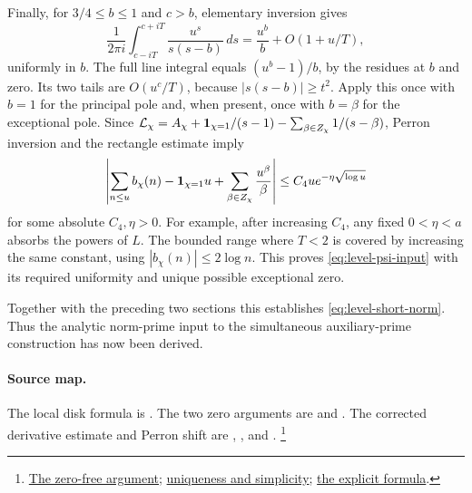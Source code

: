 Finally, for \(3/4\leq b\leq1\) and \(c>b\), elementary inversion
gives
\[
 \frac1{2\pi i}\int_{c-iT}^{c+iT}
                         \frac{u^s}{s(s-b)}\,ds
               =\frac{u^b}{b}+O(1+u/T),
\]
uniformly in \(b\).
The full line integral equals \((u^b-1)/b\), by the residues at
\(b\) and zero. Its two tails are \(O(u^c/T)\), because
\(|s(s-b)|\geq t^2\).
Apply this once with \(b=1\) for the principal pole and, when
present, once with \(b=\beta\) for the exceptional pole.
Since
\({\cal L}_\chi=A_\chi+{\bf1}_{\chi=1}/(s-1)
-\sum_{\beta\in Z_\chi}1/(s-\beta)\),
Perron inversion and the rectangle estimate imply
\[
 \left|\sum_{n\leq u}b_\chi(n)-{\bf1}_{\chi=1}u
               +\sum_{\beta\in Z_\chi}\frac{u^\beta}{\beta}\right|
                         \leq C_4u e^{-\eta\sqrt{\log u}}
\]
for some absolute \(C_4,\eta>0\).
For example, after increasing \(C_4\), any fixed
\(0<\eta<a\) absorbs the powers of \(L\).
The bounded range where \(T<2\) is covered by increasing the same
constant, using \(|b_\chi(n)|\leq2\log n\).
This proves \eqref{eq:level-psi-input} with its required uniformity
and unique possible exceptional zero.

Together with the preceding two sections this establishes
\eqref{eq:level-short-norm}. Thus the analytic norm-prime input to
the simultaneous auxiliary-prime construction has now been derived.

\paragraph{Source map.}
The local disk formula is
.
The two zero arguments are 
and .
The corrected derivative estimate and Perron shift are
,
, and
.
\footnote{\href{https://github.com/Deicyde/riemann-hypothesis/blob/40e56bab026552e089d7afcfeff08d2defb9c005/src/Development/AbelianVarietyTheory/Proofs/GlobalInterpolation/RayClassLFunctionZeroFreeRegion.lean}{The zero-free argument};
\href{https://github.com/Deicyde/riemann-hypothesis/blob/40e56bab026552e089d7afcfeff08d2defb9c005/src/Development/AbelianVarietyTheory/Proofs/GlobalInterpolation/RayClassLFunctionUniqueSimpleExceptionalZero.lean}{uniqueness and simplicity};
\href{https://github.com/Deicyde/riemann-hypothesis/blob/40e56bab026552e089d7afcfeff08d2defb9c005/src/Development/AbelianVarietyTheory/Proofs/GlobalInterpolation/RayClassFamilyPsiWithExceptionalZero.lean}{the explicit formula}.}
